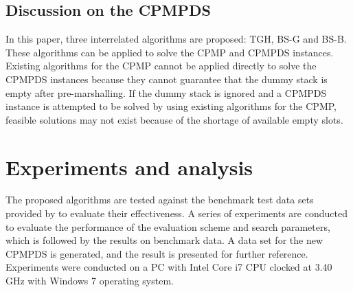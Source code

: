 \documentclass[review,3p,times,authoryear,12pt]{elsarticle}
\begin{document}
\subsection{Discussion on the CPMPDS}

In this paper, three interrelated algorithms are proposed: TGH, BS-G and BS-B.
These algorithms can be applied to solve the CPMP and CPMPDS instances. Existing algorithms for the CPMP cannot be applied directly to solve the CPMPDS instances because they cannot guarantee that the dummy stack is empty after pre-marshalling.
If the dummy stack is ignored and a CPMPDS instance is attempted to be solved by using existing algorithms for the CPMP, feasible solutions may not exist because of the shortage of available empty slots.

\section{Experiments and analysis}
\label{sec:ce}

The proposed algorithms are tested against the benchmark test data sets provided by \cite{BF2012} to evaluate their effectiveness.
A series of experiments are conducted to evaluate the performance of the evaluation scheme and search parameters, which is followed by the results on benchmark data.
A data set for the new CPMPDS is generated, and the result is presented for further reference.
Experiments were conducted on a PC with Intel Core i7 CPU clocked at 3.40 GHz with Windows 7 operating system.
\end{document}
